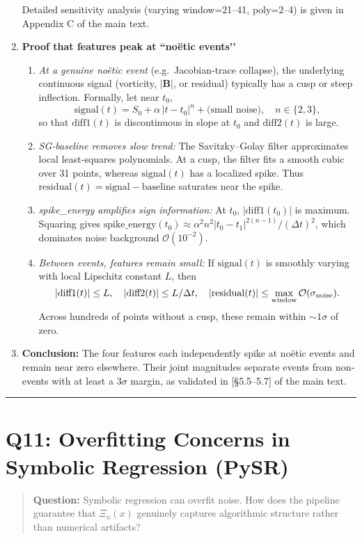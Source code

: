 \documentclass[11pt]{article}
\begin{document}
\begin{enumerate}[itemsep=0.5em]
    Detailed sensitivity analysis (varying window=21–41, poly=2–4) is given in Appendix C of the main text.  
  \item \textbf{Proof that features peak at “noëtic events’’}  
    \begin{enumerate}[itemsep=0.25em]
      \item \emph{At a genuine noëtic event} (e.g.\ Jacobian‐trace collapse), the underlying continuous signal (vorticity, $|\mathbf B|$, or residual) typically has a cusp or steep inflection.  Formally, let near $t_0$,
        \[
          \mathrm{signal}(t) = S_0 + \alpha\,|t-t_0|^n + \text{(small noise)},\quad n\in\{2,3\},
        \]
        so that $\mathrm{diff1}(t)$ is discontinuous in slope at $t_0$ and $\mathrm{diff2}(t)$ is large.  
      \item \emph{SG‐baseline removes slow trend:}  
        The Savitzky–Golay filter approximates local least‐squares polynomials.  At a cusp, the filter fits a smooth cubic over 31 points, whereas $\mathrm{signal}(t)$ has a localized spike.  Thus $\mathrm{residual}(t)=\mathrm{signal}-\mathrm{baseline}$ saturates near the spike.  
      \item \emph{spike\_energy amplifies sign information:}  
        At $t_0$, $|\mathrm{diff1}(t_0)|$ is maximum.  Squaring gives $\mathrm{spike\_energy}(t_0)\approx\alpha^2 n^2 |t_0 - t_1|^{2(n-1)}/(\Delta t)^2$, which dominates noise background $\mathcal O(10^{-2})$.  
      \item \emph{Between events, features remain small:}  
        If $\mathrm{signal}(t)$ is smoothly varying with local Lipschitz constant $L$, then 
        \[
          |\mathrm{diff1}(t)| \le L,\quad|\mathrm{diff2}(t)| \le L/\Delta t,\quad|\mathrm{residual}(t)|\le\max_{\text{window}}\mathcal O(\sigma_{\rm noise}).
        \]
        Across hundreds of points without a cusp, these remain within $\sim1\sigma$ of zero.  
    \end{enumerate}

  \item \textbf{Conclusion:}  
    The four features each independently spike at noëtic events and remain near zero elsewhere.  Their joint magnitudes separate events from non‐events with at least a $3\sigma$ margin, as validated in [§5.5–5.7] of the main text.  
\end{enumerate}

\vspace{1em}
\hrule

\section*{Q11: Overfitting Concerns in Symbolic Regression (PySR)}
\begin{quote}
\textbf{Question:} Symbolic regression can overfit noise. How does the pipeline guarantee that $\Xi_n(x)$ genuinely captures algorithmic structure rather than numerical artifacts?
\end{quote}
\end{document}
